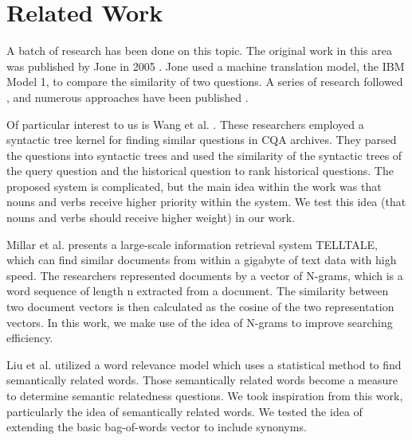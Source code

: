 \documentclass{acm_proc_article-sp}
\begin{document}
\section{Related Work}
A batch of research has been done on this topic. The original work in this area was published by  Jone in 2005 \cite{jeon2005finding}. Jone used a machine translation model, the IBM Model 1, to compare the similarity of two questions.  A series of research followed , and numerous approaches have been published \cite{cao2009use, jijkoun2005retrieving, wang2009syntactic, millar2006performance, liu2009searching}. %

Of particular interest to us is Wang et al. \cite{wang2009syntactic}. These researchers employed a syntactic tree kernel for finding similar questions in CQA archives. They parsed the questions into syntactic trees and used the similarity of the syntactic trees of the query question and the historical question to rank historical questions. The proposed system is complicated, but the main idea within the work was that nouns and verbs receive higher priority within the system. We test this idea (that nouns and verbs should receive higher weight) in our work.

Millar et al. \cite {millar2006performance} presents a large-scale information retrieval system TELLTALE, which can find similar documents from within a gigabyte of text data with high speed.  The researchers represented documents by a vector of N-grams, which is a word sequence of length n extracted from a document. The similarity between two document vectors is then calculated as the cosine of the two representation vectors. In this work, we make use of the idea of N-grams to improve searching efficiency.
 
Liu et al. \cite{liu2009searching} utilized a word relevance model which uses a  statistical method to find semantically related words. Those semantically related words become a measure to determine semantic relatedness questions. We took inspiration from this work, particularly the idea of semantically related words. We tested the idea of extending the basic bag-of-words vector to include synonyms. 
\end{document}
